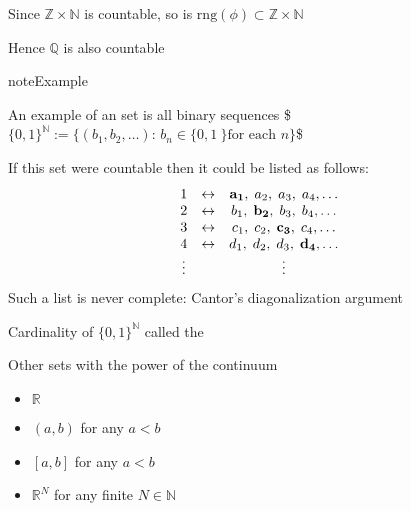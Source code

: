 \documentclass[letterpaper,10pt,english]{jupyterBook}
\begin{document}
\sphinxAtStartPar
Since \(\mathbb{Z} \times \mathbb{N}\) is countable, so is \(\mathrm{rng}(\phi) \subset \mathbb{Z} \times \mathbb{N}\)

\sphinxAtStartPar
Hence \(\mathbb{Q}\) is also countable

\begin{sphinxadmonition}{note}{Example}

\sphinxAtStartPar
An example of an  set is all binary sequences
\$\(
\{0,1\}^{\mathbb{N}} := \big\{ (b_1,b_2,\ldots) :  \, b_n \in \{0,1\ \} \text{
for each } n \big\}
\)\$
\end{sphinxadmonition}

\sphinxAtStartPar
{} If this set were countable then it could be listed as follows:
\begin{equation*}
\begin{split}
\begin{matrix}
1      & \leftrightarrow & {\bf a_1}, \; a_2, \; a_3, \; a_4, \ldots \\
2      & \leftrightarrow & b_1, \;{\bf b_2}, \; b_3, \; b_4, \ldots \\
3      & \leftrightarrow & c_1, \; c_2, \;{\bf c_3}, \; c_4, \ldots \\
4      & \leftrightarrow & d_1, \; d_2, \; d_3, \;{\bf d_4}, \ldots \\
\vdots &                 & \vdots
\end{matrix}
\end{split}
\end{equation*}
\sphinxAtStartPar
Such a list is never complete: Cantor’s diagonalization argument

\sphinxAtStartPar
Cardinality of  \(\{0,1\}^{\mathbb{N}}\) called the 

\sphinxAtStartPar
Other sets with the power of the continuum
\begin{itemize}
\item {} 
\sphinxAtStartPar
\(\mathbb{R}\)

\item {} 
\sphinxAtStartPar
\((a, b)\) for any \(a < b\)

\item {} 
\sphinxAtStartPar
\([a, b]\) for any \(a < b\)

\item {} 
\sphinxAtStartPar
\(\mathbb{R}^N\) for any finite \(N \in \mathbb{N}\)

\end{itemize}
\end{document}
